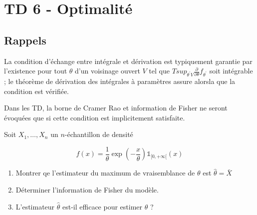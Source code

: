 \chapter*{TD 6 - Optimalité}

\section*{Rappels}
La condition d’échange entre intégrale et dérivation est typiquement garantie par l’existence pour tout $\theta$ d’un voisinage ouvert $V$ tel que $T sup_{\theta^\prime V} \frac{\partial}{\partial \theta} f_{\theta^\prime}$ soit intégrable ; le théorème de dérivation des intégrales à paramètres assure alorsla que la condition est vérifiée.

Dans les TD, la borne de Cramer Rao et information de Fisher ne seront évoquées que si cette condition
est implicitement satisfaite.

\medskip

\setcounter{exercice}{0}

\begin{mdframed}
\begin{exercice}
Soit $X_1, \dots, X_n$ un $n$-échantillon de densité 

$$
f(x) = \frac{1}{\theta} \exp\left(-\frac{x}{\theta}\right) \mathbb{1}_{[0,+\infty[}(x)
$$

\begin{enumerate}
    \item Montrer qe l'estimateur du maximum de vraisemblance de $\theta$ est $\hat{\theta} = \bar{X}$
    \item Déterminer l'information de Fisher du modèle.
    \item L'estimateur $\hat{\theta}$ est-il efficace pour estimer $\theta$ ?
\end{enumerate}
\end{exercice}
\end{mdframed}

\medskip

